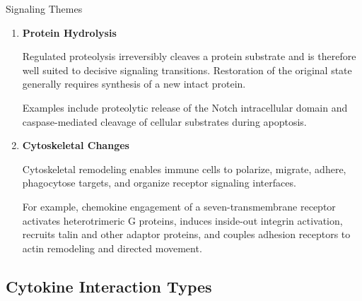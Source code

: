 \begin{core}{Signaling Themes}
\begin{enumerate}
        \item \textbf{Protein Hydrolysis}

          Regulated proteolysis irreversibly cleaves a protein substrate and is therefore well suited to decisive signaling transitions. Restoration of the original state generally requires synthesis of a new intact protein.

          Examples include proteolytic release of the Notch intracellular domain and caspase-mediated cleavage of cellular substrates during apoptosis.

        \item \textbf{Cytoskeletal Changes}

          Cytoskeletal remodeling enables immune cells to polarize, migrate, adhere, phagocytose targets, and organize receptor signaling interfaces.

          For example, chemokine engagement of a seven-transmembrane receptor activates heterotrimeric G proteins, induces inside-out integrin activation, recruits talin and other adaptor proteins, and couples adhesion receptors to actin remodeling and directed movement.

      \end{enumerate}

    \end{core}

  \subsection{Cytokine Interaction Types}

